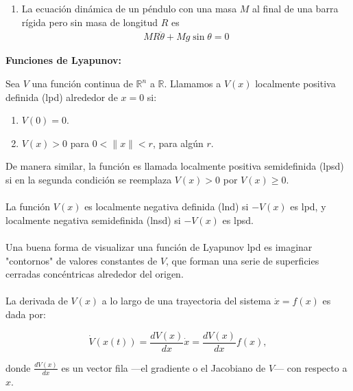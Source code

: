 \documentclass[
  11pt,
  letterpaper,
   addpoints,
   answers
  ]{exam}
\begin{document}
\begin{questions}
\begin{enumerate}
    \item La ecuación dinámica de un péndulo con una masa \( M \) al final de una barra rígida pero sin masa de longitud \( R \) es
    \begin{align}
        MR\ddot{\theta} + Mg \sin \theta = 0
    \end{align}

\end{enumerate}
\begin{solution}
    \textbf{Funciones de Lyapunov:}

    Sea \( V \) una función continua de \( \mathbb{R}^n \) a \( \mathbb{R} \). Llamamos a \( V(x) \) localmente positiva definida (lpd) alrededor de \( x = 0 \) si:
    \begin{enumerate}
        \item \( V(0) = 0 \).
        \item \( V(x) > 0 \) para \( 0 < \|x\| < r \), para algún \( r \).
    \end{enumerate}
    De manera similar, la función es llamada localmente positiva semidefinida (lpsd) si en la segunda condición se reemplaza \( V(x) > 0 \) por \( V(x) \geq 0 \).\\\\
    La función \( V(x) \) es localmente negativa definida (lnd) si \( -V(x) \) es lpd, y localmente negativa semidefinida (lnsd) si \( -V(x) \) es lpsd.\\\\
    Una buena forma de visualizar una función de Lyapunov lpd es imaginar "contornos" de valores constantes de \( V \), que forman una serie de superficies cerradas concéntricas alrededor del origen.\\\\
    La derivada de \( V(x) \) a lo largo de una trayectoria del sistema \( \dot{x} = f(x) \) es dada por:
    
    \[
    \dot{V}(x(t)) = \frac{dV(x)}{dx} \dot{x} = \frac{dV(x)}{dx} f(x),
    \]
    
    donde \( \frac{dV(x)}{dx} \) es un vector fila —el gradiente o el Jacobiano de \( V \)— con respecto a \( x \).

\end{solution}
\end{questions}
\end{document}
